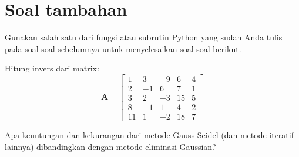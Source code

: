 \section{Soal tambahan}

Gunakan salah satu dari fungsi atau subrutin Python yang sudah Anda tulis
pada soal-soal sebelumnya untuk menyelesaikan soal-soal berikut.

\begin{soal}
Hitung invers dari matrix:
\begin{equation*}
\mathbf{A} = \begin{bmatrix}
1 & 3 & -9 & 6 & 4 \\
2 & -1 & 6 & 7 & 1 \\
3 & 2 & -3 & 15 & 5 \\
8 & -1 & 1 & 4 & 2 \\
11 & 1 & -2 & 18 & 7
\end{bmatrix}
\end{equation*}
\end{soal}

%











\begin{soal}
Apa keuntungan dan kekurangan dari metode Gauss-Seidel (dan metode iteratif lainnya)
dibandingkan dengan metode eliminasi Gaussian?
\end{soal}



